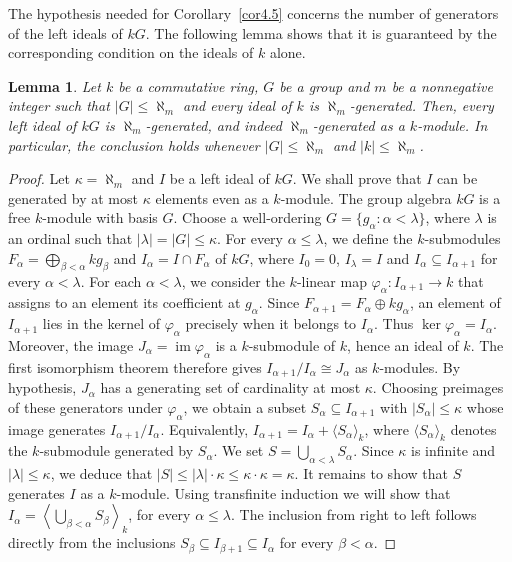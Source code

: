 \documentclass[12pt]{amsart}
\newtheorem{lemma}[theorem]{Lemma}
\theoremstyle{remark}
\theoremstyle{definition}
\theoremstyle{plain}
\newcommand{\alephm}{\aleph_m}
\begin{document}
The hypothesis needed for Corollary~\ref{cor4.5} concerns the number of generators of the left ideals of $kG$. The following lemma shows that it is guaranteed by the corresponding condition on the ideals of $k$ alone.

\begin{lemma}\label{lem5.5} Let $k$ be a commutative ring, $G$ be a group and $m$ be a nonnegative integer such that $|G|\le\alephm$ and every ideal of $k$ is $\alephm$-generated. Then, every left ideal of $kG$ is $\alephm$-generated, and indeed $\alephm$-generated as a $k$-module. In particular, the conclusion holds whenever
$|G|\leq\aleph_m$ and $|k|\leq\aleph_m$.\end{lemma}

\begin{proof}Let $\kappa=\aleph_m$ and $I$ be a left ideal of $kG$.
We shall prove that $I$ can be generated by at most $\kappa$ elements even as a $k$-module. The group algebra $kG$ is a free $k$-module with basis $G$.
Choose a well-ordering $G=\{g_\alpha:\alpha<\lambda\}$,
where $\lambda$ is an ordinal such that $|\lambda|=|G|\leq\kappa$.
For every $\alpha\leq\lambda$, we define the $k$-submodules $F_\alpha=\bigoplus_{\beta<\alpha}kg_\beta$ and $I_\alpha=I\cap F_\alpha$ of $kG$, where $I_0=0$, $I_\lambda=I$ and $I_\alpha\subseteq I_{\alpha+1}$ for every $\alpha<\lambda$. For each $\alpha<\lambda$, we consider the $k$-linear map
$\varphi_\alpha:I_{\alpha+1}\rightarrow k$ that assigns to an element its coefficient at $g_\alpha$. Since
$F_{\alpha+1}=F_\alpha\oplus kg_\alpha$,
an element of $I_{\alpha+1}$ lies in the kernel of
$\varphi_\alpha$ precisely when it belongs to $I_\alpha$.
Thus $\ker\varphi_\alpha=I_\alpha$. Moreover, the image
$J_\alpha=\operatorname{im}\varphi_\alpha$
is a $k$-submodule of $k$, hence an ideal of $k$.
The first isomorphism theorem therefore gives
$I_{\alpha+1}/I_\alpha\cong J_\alpha$
as $k$-modules. By hypothesis, $J_\alpha$ has a generating set of
cardinality at most $\kappa$. Choosing preimages of these generators under
$\varphi_\alpha$, we obtain a subset
$S_\alpha\subseteq I_{\alpha+1}$ with
$|S_\alpha|\leq\kappa$ whose image generates
$I_{\alpha+1}/I_\alpha$.
Equivalently, $I_{\alpha+1}=I_\alpha+\langle S_\alpha\rangle_k$,
where $\langle S_\alpha\rangle_k$ denotes the
$k$-submodule generated by $S_\alpha$. We set $S=\bigcup_{\alpha<\lambda}S_\alpha$.
Since $\kappa$ is infinite and $|\lambda|\leq\kappa$,
we deduce that $|S|\leq |\lambda|\cdot\kappa
\leq \kappa\cdot\kappa=\kappa$.
It remains to show that $S$ generates $I$ as a $k$-module. Using transfinite induction we will show that $I_\alpha=\left\langle\bigcup_{\beta<\alpha}S_\beta\right\rangle_k$, for every $\alpha\leq\lambda$. The inclusion from right to left follows directly from the inclusions $S_\beta\subseteq I_{\beta+1}\subseteq I_\alpha$ for every $\beta<\alpha$.

\end{proof}
\end{document}
